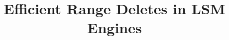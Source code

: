 \documentclass[sigconf]{acmart}
\begin{document}
\title{Efficient Range Deletes in LSM Engines}













\begin{abstract}
    
\end{abstract}




\maketitle
\end{document}
